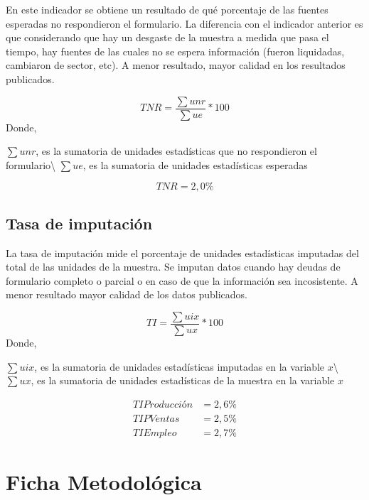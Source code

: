 \documentclass[
]{article}
\begin{document}
En este indicador se obtiene un resultado de qué porcentaje de las
fuentes esperadas no respondieron el formulario. La diferencia con el
indicador anterior es que considerando que hay un desgaste de la muestra
a medida que pasa el tiempo, hay fuentes de las cuales no se espera
información (fueron liquidadas, cambiaron de sector, etc). A menor
resultado, mayor calidad en los resultados publicados.

\begin{equation*}
TNR = \frac{\sum unr}{\sum ue}*100
\end{equation*} Donde,

\(\sum unr\), es la sumatoria de unidades estadísticas que no
respondieron el formulario\textbackslash{} \(\sum ue\), es la sumatoria
de unidades estadísticas esperadas

\begin{equation*}
TNR = 2,0\%
\end{equation*}

\hypertarget{tasa-de-imputaciuxf3n}{%
\subsection{Tasa de imputación}\label{tasa-de-imputaciuxf3n}}

La tasa de imputación mide el porcentaje de unidades estadísticas
imputadas del total de las unidades de la muestra. Se imputan datos
cuando hay deudas de formulario completo o parcial o en caso de que la
información sea incosistente. A menor resultado mayor calidad de los
datos publicados.

\begin{equation*}
TI = \frac{\sum uix}{\sum ux}*100
\end{equation*} Donde,

\(\sum uix\), es la sumatoria de unidades estadísticas imputadas en la
variable \(x\)\textbackslash{} \(\sum ux\), es la sumatoria de unidades
estadísticas de la muestra en la variable \(x\)

\begin{align*}
TIProducción &= 2,6\%\\
TIPVentas &= 2,5\%\\
TIEmpleo &= 2,7\%
\end{align*}

\hypertarget{ficha-metodoluxf3gica}{%
\section{Ficha Metodológica}\label{ficha-metodoluxf3gica}}
\end{document}
